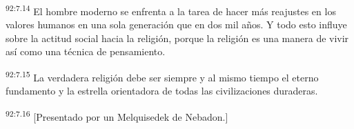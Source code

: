 \documentclass[twoside, 11pt]{book}
\begin{document}
\par
\textsuperscript{92:7.14} El hombre moderno se enfrenta a la tarea de hacer más reajustes en los valores humanos en una sola generación que en dos mil años. Y todo esto influye sobre la actitud social hacia la religión, porque la religión es una manera de vivir así como una técnica de pensamiento.

\par
\textsuperscript{92:7.15} La verdadera religión debe ser siempre y al mismo tiempo el eterno fundamento y la estrella orientadora de todas las civilizaciones duraderas.

\par
\textsuperscript{92:7.16} [Presentado por un Melquisedek de Nebadon.]


\newpage
\pagestyle{empty}
\end{document}
